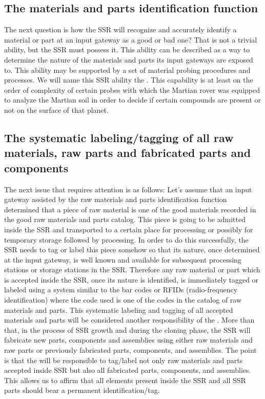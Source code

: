\subsection[The materials and parts identification function]{The
materials and parts identification function}

The next question is how the SSR
will recognize and accurately identify a material or part at an input
gateway as a good or bad one? That is not a trivial ability, but the
SSR must possess it. This ability can be described as a way to
determine the nature of the materials and parts its input gateways are
exposed to. This ability may be supported by a set of material probing
procedures and processes. We will name this SSR ability the
. This capability
is at least on the order of complexity of certain probes with which the
Martian rover was equipped to analyze the Martian soil in order to
decide if certain compounds are present or not on the surface of that
planet.

\subsection[The systematic labeling/tagging of all raw materials, raw
parts and fabricated parts and components]{The systematic
labeling/tagging of all raw materials, raw parts and fabricated parts
and components}

The next issue that requires
attention is as follows: Let’s assume that an input gateway
assisted by the raw materials and parts identification function
determined that a piece of raw material is one of the good materials
recorded in the good raw materials and parts catalog. This piece is
going to be admitted inside the SSR and transported to a certain place
for processing or possibly for temporary storage followed by
processing.  In order to do this successfully, the SSR needs
to tag or label this piece somehow so that its nature, once
determined at the input gateway, is well known and available for
subsequent processing stations or storage stations in the SSR. Therefore
any raw material or part which is accepted inside the SSR, once
its nature is identified, is immediately tagged or labeled using a system
similar to the bar codes or RFIDs (radio-frequency identification)
where the code used is one of the codes in the catalog of raw materials
and parts. This systematic labeling and tagging of all accepted
materials and parts will be considered another responsibility of the
.  More than that,
in the process of SSR growth and during the cloning
phase, the SSR will fabricate new parts, components and assemblies
using either raw materials and raw parts or previously fabricated
parts, components, and assemblies. The point is that the 
will be responsible to tag/label not
only raw materials and parts accepted inside SSR but also all
fabricated parts, components, and assemblies. This allows us to affirm
that all elements present inside the SSR and all SSR parts should bear
a permanent identification/tag.

